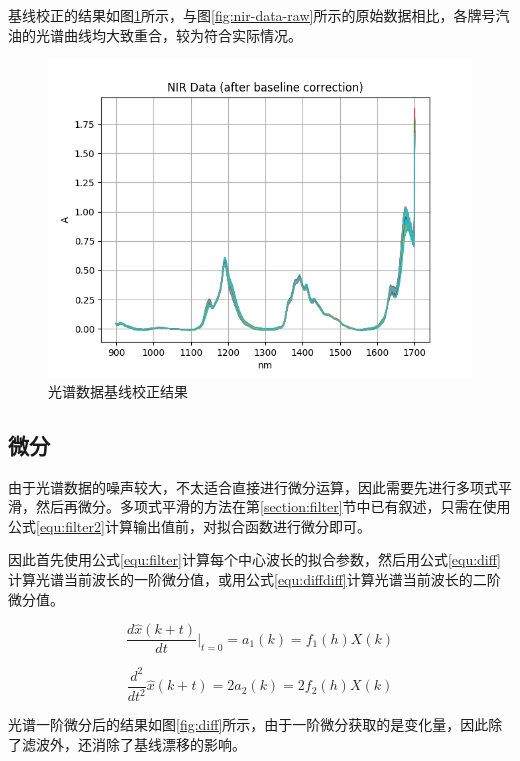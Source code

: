 \documentclass[a4paper]{article}
\begin{document}
			基线校正的结果如图\ref{fig:baseline}所示，与图\ref{fig:nir-data-raw}所示的原始数据相比，各牌号汽油的光谱曲线均大致重合，较为符合实际情况。
			
			\begin{figure}[h]
				\centering
				\includegraphics[width=\linewidth]{../img/baseline}
				\caption{光谱数据基线校正结果}
				\label{fig:baseline}
			\end{figure}
			
		\subsection{微分}
			由于光谱数据的噪声较大，不太适合直接进行微分运算，因此需要先进行多项式平滑，然后再微分。多项式平滑的方法在第\ref{section:filter}节中已有叙述，只需在使用公式\ref{equ:filter2}计算输出值前，对拟合函数进行微分即可。
			
			因此首先使用公式\ref{equ:filter}计算每个中心波长的拟合参数，然后用公式\eqref{equ:diff}计算光谱当前波长的一阶微分值，或用公式\eqref{equ:diffdiff}计算光谱当前波长的二阶微分值。
			
			\begin{equation}\label{equ:diff}
				\frac{d\hat{x}(k+t)}{dt}\bigg|_{t=0}
				= a_1(k) =
				f_1(h)X(k)
			\end{equation}
			
			\begin{equation}\label{equ:diffdiff}
				\frac{d^2}{dt^2}\hat{x}(k+t)
				= 2a_2(k) =
				2f_2(h)X(k)
			\end{equation}
			
			光谱一阶微分后的结果如图\ref{fig:diff}所示，由于一阶微分获取的是变化量，因此除了滤波外，还消除了基线漂移的影响。
			
\end{document}
